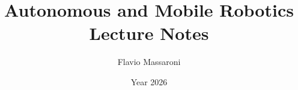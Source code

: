 \documentclass[11pt,a4paper,openany]{book}
\title{Autonomous and Mobile Robotics\\Lecture Notes}
\author{Flavio Massaroni}
\date{Year 2026}
\begin{document}
\frontmatter


\tableofcontents
\listoftables

\mainmatter














\appendix




\backmatter
\printbibliography

\end{document}
